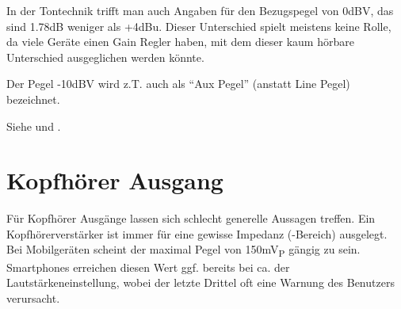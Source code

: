 \documentclass[9pt,german]{article}
\begin{document}
In der Tontechnik trifft man auch Angaben f\"ur den Bezugspegel von 0dBV, das sind 1.78dB weniger als +4dBu.
Dieser Unterschied spielt meistens keine Rolle, da viele Ger\"ate einen Gain Regler haben, mit dem dieser kaum
h\"orbare Unterschied ausgeglichen werden k\"onnte.

Der Pegel -10dBV wird z.T. auch als ``Aux Pegel'' (anstatt Line Pegel) bezeichnet.

{\small Siehe \cite{kirstein} und \cite{shure}.}



\section*{Kopfh\"orer Ausgang}

F\"ur Kopfh\"orer Ausg\"ange lassen sich schlecht generelle Aussagen treffen. Ein Kopfh\"orerverst\"arker ist immer f\"ur
eine gewisse Impedanz (-Bereich) ausgelegt.
\\

Bei Mobilger\"aten scheint der maximal Pegel von 150mV\textsubscript{P} g\"angig zu sein. Smartphones erreichen
diesen Wert ggf. bereits bei ca.  der Lautst\"arkeneinstellung, wobei der letzte Drittel oft eine
Warnung des Benutzers verursacht.



\printbibliography[title=Quellen]
\end{document}
